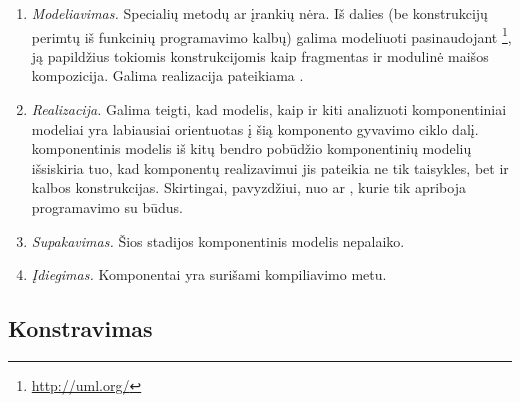 \begin{enumerate}
  \item \emph{Modeliavimas.}
    Specialių metodų ar įrankių nėra. Iš dalies (be konstrukcijų
    perimtų iš funkcinių programavimo kalbų) galima modeliuoti
    pasinaudojant \footnote{\url{http://uml.org/}}, ją
    papildžius tokiomis konstrukcijomis kaip fragmentas ir
    modulinė maišos kompozicija. Galima realizacija pateikiama
    \cite[145]{rachimow2009scala}.
  \item \emph{Realizacija.}
    Galima teigti, kad  modelis, kaip ir kiti
    \cite{classification-framework-for-scm} analizuoti komponentiniai
    modeliai yra labiausiai orientuotas į šią komponento gyvavimo
    ciklo dalį.  komponentinis modelis iš kitų
    bendro pobūdžio komponentinių modelių išsiskiria tuo, kad
    komponentų realizavimui jis pateikia ne tik taisykles, bet ir
    kalbos konstrukcijas. Skirtingai, pavyzdžiui, nuo 
    ar , kurie tik apriboja programavimo su
     būdus.
  \item \emph{Supakavimas.}
    Šios stadijos  komponentinis modelis nepalaiko.
  \item \emph{Įdiegimas.}
    Komponentai yra surišami kompiliavimo metu.
\end{enumerate}

\subsection{Konstravimas}

